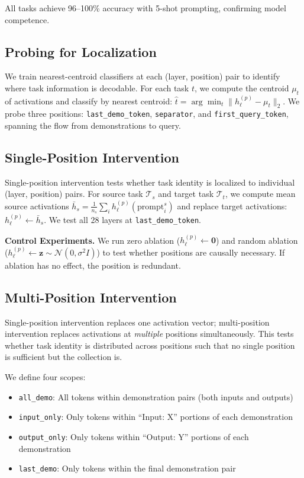 \documentclass[sigconf,anonymous]{acmart}
\begin{document}
All tasks achieve 96--100\% accuracy with 5-shot prompting, confirming model competence.

\subsection{Probing for Localization}

We train nearest-centroid classifiers at each (layer, position) pair to identify where task information is decodable. For each task $t$, we compute the centroid $\mu_t$ of activations and classify by nearest centroid: $\hat{t} = \arg\min_t \|h_\ell^{(p)} - \mu_t\|_2$. We probe three positions: \texttt{last\_demo\_token}, \texttt{separator}, and \texttt{first\_query\_token}, spanning the flow from demonstrations to query.

\subsection{Single-Position Intervention}

Single-position intervention tests whether task identity is localized to individual (layer, position) pairs. For source task $\mathcal{T}_s$ and target task $\mathcal{T}_t$, we compute mean source activations $\bar{h}_s = \frac{1}{n_s}\sum_i h_\ell^{(p)}(\text{prompt}_i^s)$ and replace target activations: $h_\ell^{(p)} \leftarrow \bar{h}_s$. We test all 28 layers at \texttt{last\_demo\_token}.

\textbf{Control Experiments.} We run zero ablation ($h_\ell^{(p)} \leftarrow \mathbf{0}$) and random ablation ($h_\ell^{(p)} \leftarrow \mathbf{z} \sim \mathcal{N}(0, \sigma^2 I)$) to test whether positions are causally necessary. If ablation has no effect, the position is redundant.

\subsection{Multi-Position Intervention}

Single-position intervention replaces one activation vector; multi-position intervention replaces activations at \emph{multiple} positions simultaneously. This tests whether task identity is distributed across positions such that no single position is sufficient but the collection is.

We define four scopes:
\begin{itemize}
    \item \texttt{all\_demo}: All tokens within demonstration pairs (both inputs and outputs)
    \item \texttt{input\_only}: Only tokens within ``Input: X'' portions of each demonstration
    \item \texttt{output\_only}: Only tokens within ``Output: Y'' portions of each demonstration
    \item \texttt{last\_demo}: Only tokens within the final demonstration pair
\end{itemize}
\end{document}
